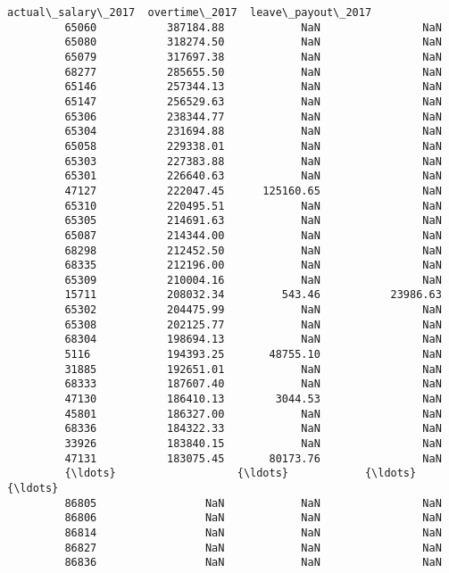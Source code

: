 \documentclass[11pt]{article}
\begin{document}
\begin{Verbatim}[commandchars=\\\{\}]
                actual\_salary\_2017  overtime\_2017  leave\_payout\_2017  
         65060           387184.88            NaN                NaN  
         65080           318274.50            NaN                NaN  
         65079           317697.38            NaN                NaN  
         68277           285655.50            NaN                NaN  
         65146           257344.13            NaN                NaN  
         65147           256529.63            NaN                NaN  
         65306           238344.77            NaN                NaN  
         65304           231694.88            NaN                NaN  
         65058           229338.01            NaN                NaN  
         65303           227383.88            NaN                NaN  
         65301           226640.63            NaN                NaN  
         47127           222047.45      125160.65                NaN  
         65310           220495.51            NaN                NaN  
         65305           214691.63            NaN                NaN  
         65087           214344.00            NaN                NaN  
         68298           212452.50            NaN                NaN  
         68335           212196.00            NaN                NaN  
         65309           210004.16            NaN                NaN  
         15711           208032.34         543.46           23986.63  
         65302           204475.99            NaN                NaN  
         65308           202125.77            NaN                NaN  
         68304           198694.13            NaN                NaN  
         5116            194393.25       48755.10                NaN  
         31885           192651.01            NaN                NaN  
         68333           187607.40            NaN                NaN  
         47130           186410.13        3044.53                NaN  
         45801           186327.00            NaN                NaN  
         68336           184322.33            NaN                NaN  
         33926           183840.15            NaN                NaN  
         47131           183075.45       80173.76                NaN  
         {\ldots}                   {\ldots}            {\ldots}                {\ldots}  
         86805                 NaN            NaN                NaN  
         86806                 NaN            NaN                NaN  
         86814                 NaN            NaN                NaN  
         86827                 NaN            NaN                NaN  
         86836                 NaN            NaN                NaN  

\end{Verbatim}
\end{document}
